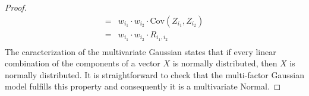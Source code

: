 \documentclass[11pt,fleqn]{book} %
\begin{document}
\begin{proof}
\begin{displaymath}
\begin{array}{rl}
			=                                         & w_{i_1} \cdot w_{i_2} \cdot \text{Cov}(Z_{i_1}, Z_{i_2})                                                   \\
			=                                         & w_{i_1} \cdot w_{i_2} \cdot R_{i_1,i_2}                                                                    \\
		\end{array}
	\end{displaymath}
	The caracterization of the multivariate Gaussian \cite[thm 2.6.2]{anderson:1984}
	states that if every linear combination of the components of a 
	vector $X$ is normally distributed, then $X$ is normally distributed.
	It is straightforward to check that the multi-factor Gaussian model 
	fulfills this property and consequently it is a multivariate Normal.
\end{proof}
\end{document}
